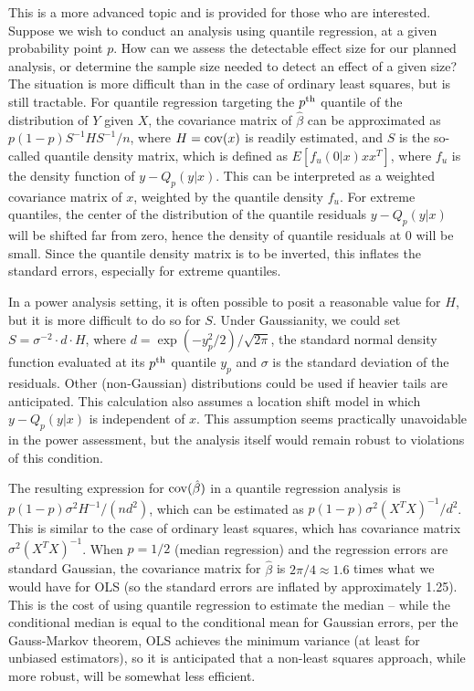 This is a more advanced topic and is provided for those who are interested.  Suppose we wish to conduct an analysis using quantile regression, at a given probability point $p$.  How can we assess the detectable effect size for our planned analysis, or determine the sample size needed to detect an effect of a given size? The situation is more difficult than in the case of ordinary least squares, but is still tractable.  For quantile regression targeting the $p^{\rm th}$ quantile of the distribution of $Y$ given $X$, the covariance matrix of $\hat{\beta}$ can be approximated as $p(1-p)S^{-1}HS^{-1}/n$, where $H = {\rm cov}(x)$ is readily estimated, and $S$ is the so-called quantile density matrix, which is defined as $E[f_u(0|x) xx^T]$, where $f_u$ is the density function of $y - Q_p(y | x)$.  This can be interpreted as a weighted covariance matrix of $x$, weighted by the quantile density $f_u$.  For extreme quantiles, the center of the distribution of the quantile residuals $y - Q_p(y | x)$ will be shifted far from zero, hence the density of quantile residuals at 0 will be small.  Since the quantile density matrix is to be inverted, this inflates the standard errors, especially for extreme quantiles.

In a power analysis setting, it is often possible to posit a reasonable value for $H$, but it is more difficult to do so for $S$.  Under Gaussianity, we could set $S = \sigma^{-2} \cdot d\cdot H$, where $d = \exp(-y_p^2/2)/\sqrt{2\pi}$, the standard normal density function evaluated at its $p^{\rm th}$ quantile $y_p$ and $\sigma$ is the standard deviation of the residuals.  Other (non-Gaussian) distributions could be used if heavier tails are anticipated.  This calculation also assumes a location shift model in which $y - Q_p(y | x)$ is independent of $x$.  This assumption seems practically unavoidable in the power assessment, but the analysis itself would remain robust to violations of this condition.

The resulting expression for ${\rm cov}(\hat{\beta})$ in a quantile regression analysis is $p(1-p)\sigma^2 H^{-1} / (nd^2)$, which can be estimated as $p(1-p)\sigma^2(X^T X)^{-1} / d^2$.  This is similar to the case of ordinary least squares, which has covariance matrix $\sigma^2 (X^T X)^{-1}$.  When $p=1/2$ (median regression) and the regression errors are standard Gaussian, the covariance matrix for $\hat{\beta}$ is $2\pi/4 \approx 1.6$ times what we would have for OLS (so the standard errors are inflated by approximately 1.25).  This is the cost of using quantile regression to estimate the median -- while the conditional median is equal to the conditional mean for Gaussian errors, per the Gauss-Markov theorem, OLS achieves the minimum variance (at least for unbiased estimators), so it is anticipated that a non-least squares approach, while more robust, will be somewhat less efficient.

